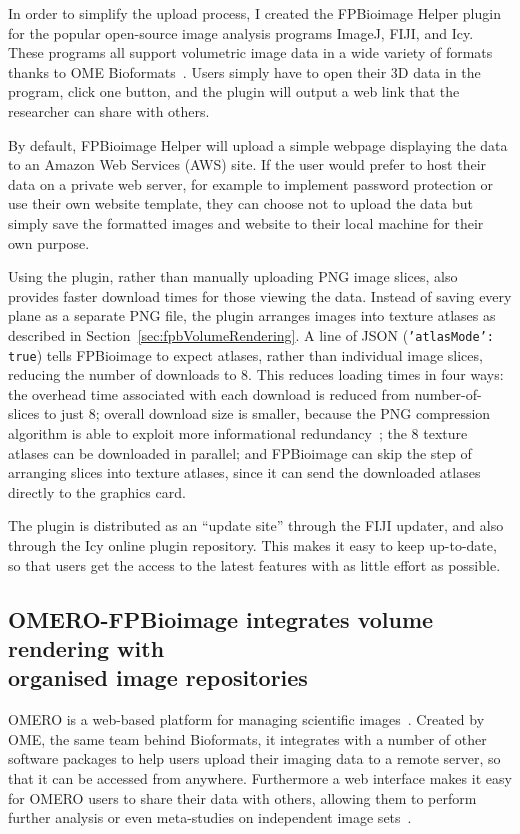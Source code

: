 In order to simplify the upload process, I created the FPBioimage Helper plugin for the popular open-source image analysis programs ImageJ, FIJI, and Icy.
These programs all support volumetric image data in a wide variety of formats thanks to OME Bioformats~\cite{linkert2010metadata}.
Users simply have to open their 3D data in the program, click one button, and the plugin will output a web link that the researcher can share with others.

By default, FPBioimage Helper will upload a simple webpage displaying the data to an Amazon Web Services (AWS) site.
If the user would prefer to host their data on a private web server, for example to implement password protection or use their own website template, they can choose not to upload the data but simply save the formatted images and website to their local machine for their own purpose.

Using the plugin, rather than manually uploading PNG image slices, also provides faster download times for those viewing the data.
Instead of saving every plane as a separate PNG file, the plugin arranges images into texture atlases as described in Section~\ref{sec:fpbVolumeRendering}.
A line of JSON (\texttt{'atlasMode': true}) tells FPBioimage to expect atlases, rather than individual image slices, reducing the number of downloads to 8.
This reduces loading times in four ways: the overhead time associated with each download is reduced from number-of-slices to just 8; overall download size is smaller, because the PNG compression algorithm is able to exploit more informational redundancy~\cite[\textit{ch. 1}]{jayaraman2011digital}; the 8 texture atlases can be downloaded in parallel; and FPBioimage can skip the step of arranging slices into texture atlases, since it can send the downloaded atlases directly to the graphics card.

The plugin is distributed as an ``update site'' through the FIJI updater, and also through the Icy online plugin repository.
This makes it easy to keep up-to-date, so that users get the access to the latest features with as little effort as possible.

\subsection[OMERO-FPBioimage integrates volume rendering with organised image repositories]{OMERO-FPBioimage integrates volume rendering with\\ organised image repositories}
OMERO is a web-based platform for managing scientific images~\cite{moore2015omero}.
Created by OME, the same team behind Bioformats, it integrates with a number of other software packages to help users upload their imaging data to a remote server, so that it can be accessed from anywhere.
Furthermore a web interface makes it easy for OMERO users to share their data with others, allowing them to perform further analysis or even meta-studies on independent image sets~\cite{williams2017image}.

